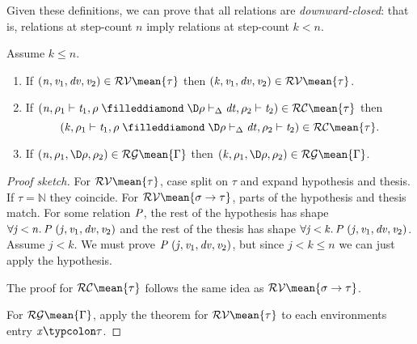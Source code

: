 Given these definitions, we can prove that all relations are
\emph{downward-closed}: that is, relations at step-count $n$
imply relations at step-count $k < n$.
\begin{lemma}
  \label{lem:validity-typed-downward-closed}
  Assume $k \le n$.
  \begin{enumerate}
  \item If \ensuremath{(\Varid{n},\Varid{v}_{1},\Varid{dv},\Varid{v}_{2})\in \mathcal{RV}\mean{\tau}} then \ensuremath{(\Varid{k},\Varid{v}_{1},\Varid{dv},\Varid{v}_{2})\in \mathcal{RV}\mean{\tau}}.
  \item If \ensuremath{(\Varid{n},\rho_{1}\vdash\Varid{t}_{1},\rho\mathrel{\filleddiamond}\D\rho\vdash_{\Delta}\Varid{dt},\rho_{2}\vdash\Varid{t}_{2})\in \mathcal{RC}\mean{\tau}} then
    \[\ensuremath{(\Varid{k},\rho_{1}\vdash\Varid{t}_{1},\rho\mathrel{\filleddiamond}\D\rho\vdash_{\Delta}\Varid{dt},\rho_{2}\vdash\Varid{t}_{2})\in \mathcal{RC}\mean{\tau}}.\]
  \item If \ensuremath{(\Varid{n},\rho_{1},\D\rho,\rho_{2})\in \mathcal{RG}\mean{\Gamma}} then
    \ensuremath{(\Varid{k},\rho_{1},\D\rho,\rho_{2})\in \mathcal{RG}\mean{\Gamma}}.
  \end{enumerate}
\end{lemma}
\begin{proof}[Proof sketch]
  For \ensuremath{\mathcal{RV}\mean{\tau}}, case split on \ensuremath{\tau} and expand hypothesis and
thesis. If \ensuremath{\tau\mathrel{=}\mathbb{N}} they coincide. For \ensuremath{\mathcal{RV}\mean{\sigma\to \tau}}, parts of the hypothesis and thesis match.
For some relation \ensuremath{\Conid{P}},
the rest of the hypothesis has shape \ensuremath{\forall \Varid{j}\hsforall \mathbin{<}\Varid{n}\hsdot{\circ }{\mathpunct{.}}\Conid{P}\;(\Varid{j},\Varid{v}_{1},\Varid{dv},\Varid{v}_{2})}
and the rest of the thesis has shape \ensuremath{\forall \Varid{j}\hsforall \mathbin{<}\Varid{k}\hsdot{\circ }{\mathpunct{.}}\Conid{P}\;(\Varid{j},\Varid{v}_{1},\Varid{dv},\Varid{v}_{2})}. Assume $j < k$. We must prove \ensuremath{\Conid{P}\;(\Varid{j},\Varid{v}_{1},\Varid{dv},\Varid{v}_{2})}, but since
$j < k \le n$ we can just apply the hypothesis.

The proof for \ensuremath{\mathcal{RC}\mean{\tau}} follows the same idea as
\ensuremath{\mathcal{RV}\mean{\sigma\to \tau}}.

For \ensuremath{\mathcal{RG}\mean{\Gamma}}, apply the theorem for \ensuremath{\mathcal{RV}\mean{\tau}} to each
environments entry \ensuremath{\Varid{x}\typcolon\tau}.
\end{proof}

